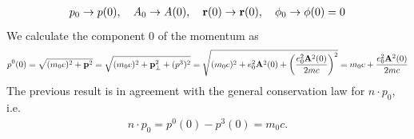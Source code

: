 \begin{align}
    p_0\rightarrow p(0),\quad  A_0 \rightarrow A(0), \quad {\bf r}(0)\rightarrow {\bf r}(0),\quad  \phi_0 \rightarrow \phi(0)=0
\end{align}
We calculate the component 0 of the momentum as
\begin{align}
    p^0 (0)= \sqrt{(m_0c)^2 + {\bf p}^2} = \sqrt{(m_0c)^2 + {\bf p}_{\perp}^2 + (p^3)^2} = \sqrt{(m_0c)^2 + e_0^2{\bf A}^2(0) + \left(\frac{e_0^2{\bf A}^2(0)}{2mc}\right)^2} = m_0c + \frac{e_0^2{\bf A}^2(0)}{2mc}
\end{align}
The previous result is in agreement with the general conservation law for \(n\cdot p_0\), i.e.
\begin{align}
    n\cdot p_0 = p^0(0) - p^3(0) = m_0c.
\end{align}

